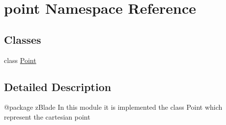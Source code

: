 \hypertarget{namespacepoint}{\section{point \-Namespace \-Reference}
\label{namespacepoint}
}
\subsection*{\-Classes}
\begin{DoxyCompactItemize}
\item 
class \hyperlink{classpoint_1_1Point}{\-Point}
\end{DoxyCompactItemize}


\subsection{\-Detailed \-Description}
\begin{DoxyVerb}@package zBlade
In this module it is implemented the class Point which represent 
the cartesian point    
\end{DoxyVerb}
 